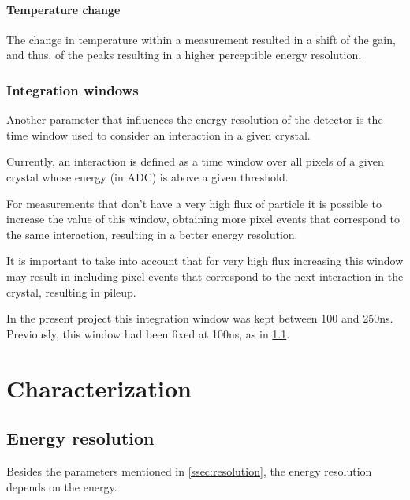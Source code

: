 \paragraph*{Temperature change}

The change in temperature within a measurement resulted in a shift of the gain, and thus, of the peaks resulting in a higher perceptible energy resolution.

\subsubsection{Integration windows}

Another parameter that influences the energy resolution of the detector is the time window used to consider an interaction in a given crystal.

Currently, an interaction is defined as a time window over all pixels of a given crystal whose energy (in ADC) is above a given threshold.

For measurements that don't have a very high flux of particle it is possible to increase the value of this window, obtaining more pixel events that correspond to the same interaction, resulting in a better energy resolution.

It is important to take into account that for very high flux increasing this window may result in including pixel events that correspond to the next interaction in the crystal, resulting in pileup.

In the present project this integration window was kept between 100 and 250ns. Previously, this window had been fixed at 100ns, as in \ref{}.

\section{Characterization}\label{sec:characterization}

\subsection{Energy resolution}

Besides the parameters mentioned in \ref{ssec:resolution}, the energy resolution depends on the energy.

